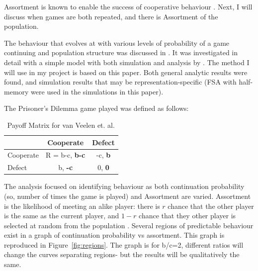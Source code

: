 \documentclass[a4paper,11pt,bcshonoursthesis,singlespace,oneside,thesisdraft,pdflatex]{cssethesis}
\begin{document}
Assortment is known to enable the success of cooperative behaviour \citep{bergstrom2003algebra}. 
Next, I will discuss when games are both repeated, and there is Assortment of the population.

The behaviour that evolves at with various levels of probability of a game continuing and population structure was discussed in \citet{axelrod:Science:1981}. It was investigated in detail with a simple model with both simulation and analysis by \citet{van-veelen:PNAS:2012}.
The method I will use in my project is based on this paper. 
Both general analytic results were found, and simulation results that may be representation-specific (FSA with half-memory were used in the simulations in this paper). 

The Prisoner's Dilemma game played was defined as follows:
\begin{table}[h]\centering
\captionsetup{justification=centering}
\begin{tabular}{|l|c|c|}
\hline
 & \bf{Cooperate} & \bf{Defect}\\
\hline
Cooperate & R = b-c, \bf{b-c} & -c, \bf{b}\\
\hline
Defect & b, \bf{-c}  & 0, \bf{0} \\
\hline
\end{tabular}
\caption{Payoff Matrix for van Veelen et. al.}
\label{table:directReciprocity}
\end{table}

The analysis focused on identifying behaviour as both continuation probability (so, number of times the game is played) and Assortment are varied. Assortment is the likelihood of meeting an alike player: there is $r$ chance that the other player is the same as the current player, and $1-r$ chance that they other player is selected at random from the population \citep{eshel:PNAS:1982}. Several regions of predictable behaviour exist in a graph of continuation probability vs assortment. This graph is reproduced in Figure~\ref{fig:regions}. The graph is for b/c=2, different ratios will change the curves separating regions- but the results will be qualitatively the same. 
\end{document}
